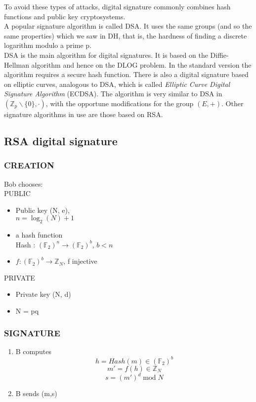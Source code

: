 \documentclass[a4paper, 10pt, titlepage]{article}
\begin{document}
To avoid these types of attacks, digital signature commonly combines hash functions and public key cryptosystems. \medskip \\
A popular signature algorithm is called DSA. It uses the same groups (and so the same properties) which we saw in DH, that is, the hardness of finding a discrete logarithm modulo a prime p. \\
DSA is the main algorithm for digital signatures. It is based on the Diffie-Hellman algorithm and hence on the DLOG problem. In the standard version the algorithm requires a secure hash function.
There is also a digital signature based on elliptic curves, analogous to DSA, which is called \textit{Elliptic Curve Digital Signature Algorithm} (ECDSA).
The algorithm is very similar to DSA in $(\mathbb{Z}_p \backslash \{0\}, \cdot)$, with the opportune modifications for the group $(E, +)$.
Other signature algorithms in use are those based on RSA.

\subsection{RSA digital signature}
\subsubsection*{CREATION}
Bob chooses: \\
PUBLIC \\
\begin{itemize}
\item Public key (N, e), \\$n = \log_2 (N) + 1$
\item a hash function \\Hash : $(\mathbb{F}_2)^n \rightarrow (\mathbb{F}_2)^b$, $b < n$
\item $f : (\mathbb{F}_2)^b \rightarrow \mathbb{Z}_N$, f injective
\end{itemize}
PRIVATE \\
\begin{itemize}
\item Private key (N, d)
\item N = pq
\end{itemize}
\subsubsection*{SIGNATURE}
\begin{enumerate}
\item B computes
$$h = Hash(m) \in (\mathbb{F}_2)^b$$
$$m' = f(h) \in \mathbb{Z}_N$$
$$s = (m')^d \; \text{mod} \; N$$
\item B sends (m,s)
\end{enumerate}
\end{document}
